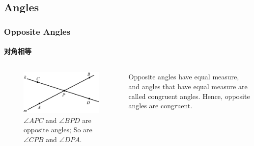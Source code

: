 \documentclass[
	11pt, %
]{beamer}
\begin{document}
\subsection{Angles}


\begin{frame}
	\frametitle{Opposite Angles} %
	\framesubtitle{对角相等}
	\begin{columns}[t] 
		\begin{column}{0.4\textwidth} %
			\begin{figure}
				\includegraphics[width=\linewidth]{Angles.jpg}
				\caption{$\angle APC$ and $\angle BPD$ are opposite angles; So are  $\angle CPB$ and $\angle DPA$.}
			\end{figure}
		\end{column}

	\begin{column}{0.6\textwidth} %
		\begin{definition}
		Opposite angles have equal measure, and angles that have equal measure are called congruent angles. Hence, \alert{opposite angles are congruent}.
		\end{definition}
	\end{column}
	\end{columns}
\end{frame}

\end{document}
